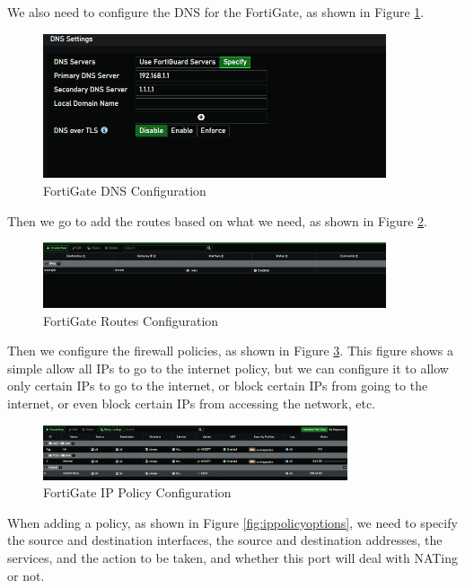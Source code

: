 \documentclass[12pt]{report}
\begin{document}
We also need to configure the DNS for the FortiGate, as shown in Figure \ref{fig:DNScfg}.
\begin{figure}
    \centering
    \includegraphics[width=0.9\textwidth]{images/Implementation/dns.png}
    \caption{FortiGate DNS Configuration}
    \label{fig:DNScfg}
\end{figure}
Then we go to add the routes based on what we need, as shown in Figure \ref{fig:routes}.
\begin{figure}
    \centering
    \includegraphics[width=0.9\textwidth]{images/Implementation/routes.png}
    \caption{FortiGate Routes Configuration}
    \label{fig:routes}
\end{figure}
Then we configure the firewall policies, as shown in Figure \ref{fig:ippolicy}. This figure shows a simple allow all IPs to go to the internet policy, but we can configure it to allow only certain IPs to go to the internet, or block certain IPs from going to the internet, or even block certain IPs from accessing the network, etc. 
\begin{figure}
    \centering
    \includegraphics[width=0.8\textwidth]{images/Implementation/ippolicy.png}
    \caption{FortiGate IP Policy Configuration}
    \label{fig:ippolicy}
\end{figure}
When adding a policy, as shown in Figure \ref{fig:ippolicyoptions}, we need to specify the source and destination interfaces, the source and destination addresses, the services, and the action to be taken, and whether this port will deal with NATing or not.
\end{document}
